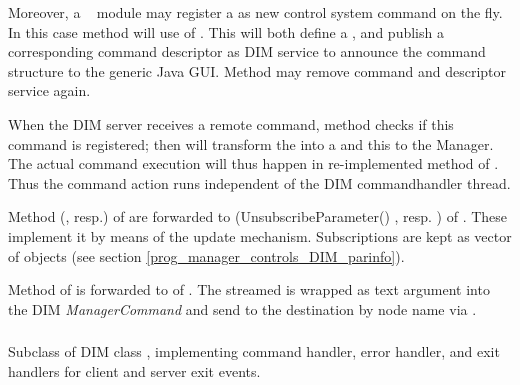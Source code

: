 \begin{compactenum}
Moreover, a \dabc~ module may register a 
 as new control system command on the fly.
In this case  method
 will use
 of .
This will both define  a , and
publish a corresponding command descriptor as DIM service to
announce the command structure to the generic Java GUI.
Method  may remove command and 
descriptor service again.


When the DIM server receives a remote command, 
method  checks if this command
is registered; then  will transform the
 into a  and 
this to the Manager. The actual command execution will thus happen
in re-implemented method  of .
Thus the command action runs independent of the DIM commandhandler thread.

\item {}
Method  (, resp.) of  
are forwarded to  (UnsubscribeParameter() , resp. ) 
of .
These implement it by means of the  update mechanism. 
Subscriptions are kept as vector of  objects
(see section \ref{prog_manager_controls_DIM_parinfo}).

\item {}   
Method  of     
is forwarded to   of .
The streamed  is wrapped as text argument
into the DIM {\em ManagerCommand} and send to the destination
by node name via .    
    
    
    
\end{compactenum}    

\subsubsection{}
\label{prog_manager_controls_DIM_server}
Subclass of DIM class , implementing command handler, error handler, and exit handlers for client and server exit events.

